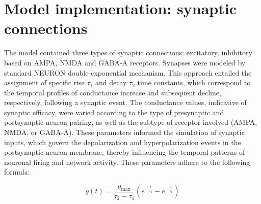 \section{Model implementation: synaptic connections}
The model contained three types of synaptic connections: excitatory, inhibitory
based on AMPA, NMDA and GABA-A receptors. Synapses were modeled by standard
NEURON double-exponential mechanism. This approach entailed the assignment of
specific rise \(\tau_1\) and decay \(\tau_2\) time constants, which correspond
to the temporal profiles of conductance increase and subsequent decline,
respectively, following a synaptic event. The conductance values, indicative of
synaptic efficacy, were varied according to the type of presynaptic and
postsynaptic neuron pairing, as well as the subtype of receptor involved (AMPA,
NMDA, or GABA-A). These parameters informed the simulation of synaptic inputs,
which govern the depolarization and hyperpolarization events in the
postsynaptic neuron membrane, thereby influencing the temporal patterns of
neuronal firing and network activity. These parameters adhere to the following formula:

\begin{equation}\label{eq:synaptic_conductance}
    g(t) = \frac{g_{\text{max}}}{\tau_2 - \tau_1} \left( e^{-\frac{t}{\tau_2}} - e^{-\frac{t}{\tau_1}} \right)
\end{equation}

